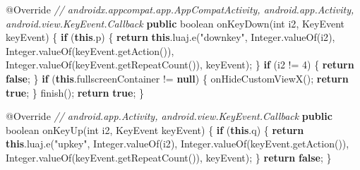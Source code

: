 \documentclass[
]{article}
\newenvironment{Shaded}{}{}
\newcommand{\AttributeTok}[1]{\textcolor[rgb]{0.49,0.56,0.16}{#1}}
\newcommand{\BuiltInTok}[1]{\textcolor[rgb]{0.00,0.50,0.00}{#1}}
\newcommand{\CommentTok}[1]{\textcolor[rgb]{0.38,0.63,0.69}{\textit{#1}}}
\newcommand{\ControlFlowTok}[1]{\textcolor[rgb]{0.00,0.44,0.13}{\textbf{#1}}}
\newcommand{\DataTypeTok}[1]{\textcolor[rgb]{0.56,0.13,0.00}{#1}}
\newcommand{\DecValTok}[1]{\textcolor[rgb]{0.25,0.63,0.44}{#1}}
\newcommand{\FunctionTok}[1]{\textcolor[rgb]{0.02,0.16,0.49}{#1}}
\newcommand{\KeywordTok}[1]{\textcolor[rgb]{0.00,0.44,0.13}{\textbf{#1}}}
\newcommand{\NormalTok}[1]{#1}
\newcommand{\OperatorTok}[1]{\textcolor[rgb]{0.40,0.40,0.40}{#1}}
\newcommand{\StringTok}[1]{\textcolor[rgb]{0.25,0.44,0.63}{#1}}
\begin{document}
\begin{Shaded}
\begin{Highlighting}[]
    \AttributeTok{@Override} \CommentTok{// androidx.appcompat.app.AppCompatActivity, android.app.Activity, android.view.KeyEvent.Callback}
    \KeywordTok{public} \DataTypeTok{boolean} \FunctionTok{onKeyDown}\OperatorTok{(}\DataTypeTok{int}\NormalTok{ i2}\OperatorTok{,} \BuiltInTok{KeyEvent}\NormalTok{ keyEvent}\OperatorTok{)} \OperatorTok{\{}
        \ControlFlowTok{if} \OperatorTok{(}\KeywordTok{this}\OperatorTok{.}\FunctionTok{p}\OperatorTok{)} \OperatorTok{\{}
            \ControlFlowTok{return} \KeywordTok{this}\OperatorTok{.}\FunctionTok{luaj}\OperatorTok{.}\FunctionTok{e}\OperatorTok{(}\StringTok{"downkey"}\OperatorTok{,} \BuiltInTok{Integer}\OperatorTok{.}\FunctionTok{valueOf}\OperatorTok{(}\NormalTok{i2}\OperatorTok{),} \BuiltInTok{Integer}\OperatorTok{.}\FunctionTok{valueOf}\OperatorTok{(}\NormalTok{keyEvent}\OperatorTok{.}\FunctionTok{getAction}\OperatorTok{()),} \BuiltInTok{Integer}\OperatorTok{.}\FunctionTok{valueOf}\OperatorTok{(}\NormalTok{keyEvent}\OperatorTok{.}\FunctionTok{getRepeatCount}\OperatorTok{()),}\NormalTok{ keyEvent}\OperatorTok{);}
        \OperatorTok{\}}
        \ControlFlowTok{if} \OperatorTok{(}\NormalTok{i2 }\OperatorTok{!=} \DecValTok{4}\OperatorTok{)} \OperatorTok{\{}
            \ControlFlowTok{return} \KeywordTok{false}\OperatorTok{;}
        \OperatorTok{\}}
        \ControlFlowTok{if} \OperatorTok{(}\KeywordTok{this}\OperatorTok{.}\FunctionTok{fullscreenContainer} \OperatorTok{!=} \KeywordTok{null}\OperatorTok{)} \OperatorTok{\{}
            \FunctionTok{onHideCustomViewX}\OperatorTok{();}
            \ControlFlowTok{return} \KeywordTok{true}\OperatorTok{;}
        \OperatorTok{\}}
        \FunctionTok{finish}\OperatorTok{();}
        \ControlFlowTok{return} \KeywordTok{true}\OperatorTok{;}
    \OperatorTok{\}}

    \AttributeTok{@Override} \CommentTok{// android.app.Activity, android.view.KeyEvent.Callback}
    \KeywordTok{public} \DataTypeTok{boolean} \FunctionTok{onKeyUp}\OperatorTok{(}\DataTypeTok{int}\NormalTok{ i2}\OperatorTok{,} \BuiltInTok{KeyEvent}\NormalTok{ keyEvent}\OperatorTok{)} \OperatorTok{\{}
        \ControlFlowTok{if} \OperatorTok{(}\KeywordTok{this}\OperatorTok{.}\FunctionTok{q}\OperatorTok{)} \OperatorTok{\{}
            \ControlFlowTok{return} \KeywordTok{this}\OperatorTok{.}\FunctionTok{luaj}\OperatorTok{.}\FunctionTok{e}\OperatorTok{(}\StringTok{"upkey"}\OperatorTok{,} \BuiltInTok{Integer}\OperatorTok{.}\FunctionTok{valueOf}\OperatorTok{(}\NormalTok{i2}\OperatorTok{),} \BuiltInTok{Integer}\OperatorTok{.}\FunctionTok{valueOf}\OperatorTok{(}\NormalTok{keyEvent}\OperatorTok{.}\FunctionTok{getAction}\OperatorTok{()),} \BuiltInTok{Integer}\OperatorTok{.}\FunctionTok{valueOf}\OperatorTok{(}\NormalTok{keyEvent}\OperatorTok{.}\FunctionTok{getRepeatCount}\OperatorTok{()),}\NormalTok{ keyEvent}\OperatorTok{);}
        \OperatorTok{\}}
        \ControlFlowTok{return} \KeywordTok{false}\OperatorTok{;}
    \OperatorTok{\}}


\end{Highlighting}
\end{Shaded}
\end{document}
